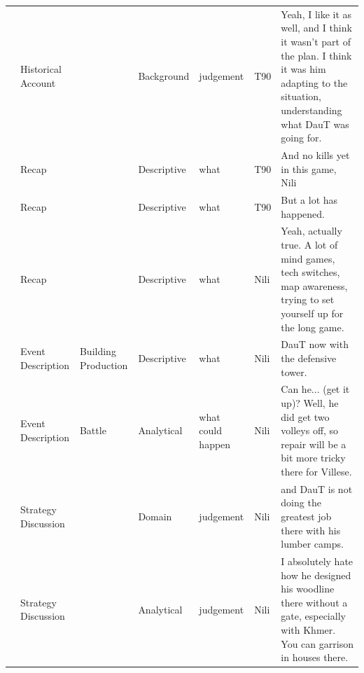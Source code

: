 {\begin{longtable}{@{}>{\theAppRow}r|L{2.3cm}L{2.2cm}L{1.4cm}L{2.2cm}L{0.5cm}U{5.6cm}@{}}
    & Historical Account    &                      & Background  & judgement         & T90     & Yeah, I like it as well, and I think it wasn't part of the plan. I think it was him adapting to the situation, understanding what DauT was going for.                                                                    \\
    & Recap                 &                      & Descriptive   & what              & T90     & And no kills yet in this game, Nili                                                                                                                                                                                      \\
    & Recap                 &                      & Descriptive   & what              & T90     & But a lot has happened.                                                                                                                                                                                                  \\
    & Recap                 &                      & Descriptive   & what              & Nili    & Yeah, actually true. A lot of mind games, tech switches, map awareness, trying to set yourself up for the long game.                                                                                                     \\
    & Event Description     & Building Production  & Descriptive   & what              & Nili    & DauT now with the defensive tower.                                                                                                                                                                                       \\
    & Event Description     & Battle               & Analytical  & what could happen & Nili    & Can he... (get it up)? Well, he did get two volleys off, so repair will be a bit more tricky there for Villese.                                                                                                          \\
    & Strategy Discussion   &                      & Domain      & judgement         & Nili    & and DauT is not doing the greatest job there with his lumber camps.                                                                                                                                                      \\
    & Strategy Discussion   &                      & Analytical  & judgement         & Nili    & I absolutely hate how he designed his woodline there without a gate, especially with Khmer. You can garrison in houses there.                                                                                            \\

\end{longtable}}

